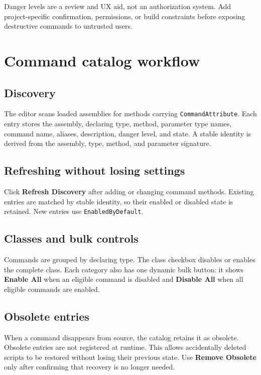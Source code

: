 \documentclass[11pt,a4paper]{article}
\begin{document}
\begin{safety}
Danger levels are a review and UX aid, not an authorization system. Add project-specific confirmation, permissions, or build constraints before exposing destructive commands to untrusted users.
\end{safety}

\section{Command catalog workflow}

\subsection{Discovery}

The editor scans loaded assemblies for methods carrying \texttt{CommandAttribute}. Each entry stores the assembly, declaring type, method, parameter type names, command name, aliases, description, danger level, and state. A stable identity is derived from the assembly, type, method, and parameter signature.

\subsection{Refreshing without losing settings}

Click \textbf{Refresh Discovery} after adding or changing command methods. Existing entries are matched by stable identity, so their enabled or disabled state is retained. New entries use \texttt{EnabledByDefault}.

\subsection{Classes and bulk controls}

Commands are grouped by declaring type. The class checkbox disables or enables the complete class. Each category also has one dynamic bulk button: it shows \textbf{Enable All} when an eligible command is disabled and \textbf{Disable All} when all eligible commands are enabled.

\subsection{Obsolete entries}

When a command disappears from source, the catalog retains it as obsolete. Obsolete entries are not registered at runtime. This allows accidentally deleted scripts to be restored without losing their previous state. Use \textbf{Remove Obsolete} only after confirming that recovery is no longer needed.
\end{document}
